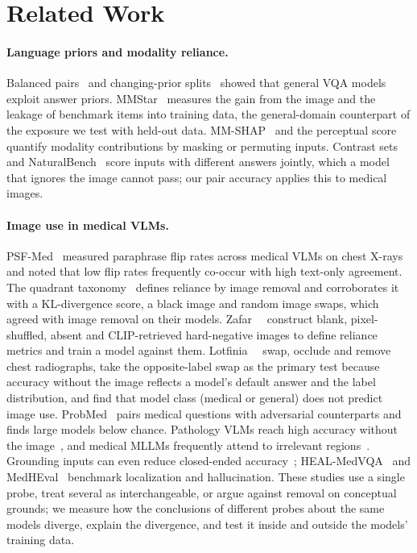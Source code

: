 \documentclass[10pt,twocolumn,letterpaper]{article}
\begin{document}
\section{Related Work}
\label{sec:related}
\paragraph{Language priors and modality reliance.} Balanced pairs~\cite{goyal2017vqav2} and changing-prior
splits~\cite{agrawal2018dont} showed that general VQA models exploit answer priors. MMStar~\cite{chen2024mmstar}
measures the gain from the image and the leakage of benchmark items into training data, the general-domain
counterpart of the exposure we test with held-out data. MM-SHAP~\cite{parcalabescu2023mmshap} and the perceptual
score~\cite{gat2021perceptual} quantify modality contributions by masking or permuting inputs. Contrast
sets~\cite{gardner2020contrast} and NaturalBench~\cite{li2024naturalbench} score inputs with different answers
jointly, which a model that ignores the image cannot pass; our pair accuracy applies this to medical images.

\paragraph{Image use in medical VLMs.} PSF-Med~\cite{sadanandan2026psfmed} measured paraphrase flip rates across
medical VLMs on chest X-rays and noted that low flip rates frequently co-occur with high text-only agreement. The
quadrant taxonomy~\cite{sadanandan2026consistent} defines reliance by image removal and corroborates it with a
KL-divergence score, a black image and random image swaps, which agreed with image removal on their models.
Zafar~\etal~\cite{zafar2026see} construct blank, pixel-shuffled, absent and CLIP-retrieved hard-negative images
to define reliance metrics and train a model against them. Lotfinia~\etal~\cite{lotfinia2026cxr} swap, occlude and
remove chest radiographs, take the opposite-label swap as the primary test because accuracy without the image
reflects a model's default answer and the label distribution, and find that model class (medical or general) does
not predict image use. ProbMed~\cite{yan2025probmed} pairs medical questions with adversarial counterparts and finds
large models below chance. Pathology VLMs reach high accuracy without the image~\cite{zhang2026pathology}, and
medical MLLMs frequently attend to irrelevant regions~\cite{liu2026medmllmfail}. Grounding inputs can even reduce
closed-ended accuracy~\cite{chen2026grounding}; HEAL-MedVQA~\cite{nguyen2025heal} and
MedHEval~\cite{chang2025medheval} benchmark localization and hallucination. These studies use a single probe, treat
several as interchangeable, or argue against removal on conceptual grounds; we measure how the conclusions of
different probes about the same models diverge, explain the divergence, and test it inside and outside the models'
training data.
\end{document}
